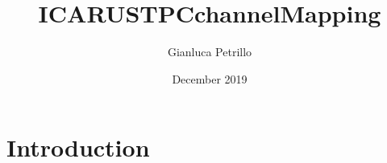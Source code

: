 \documentclass{article}
\title{ICARUSTPCchannelMapping}
\author{Gianluca Petrillo}
\date{December 2019}
\begin{document}
\maketitle

\section{Introduction}
\end{document}
